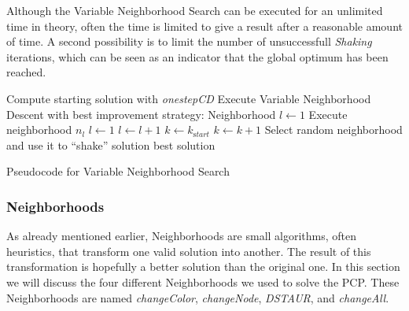 \documentclass[paper=a4,fontsize=12pt]{scrartcl}
\begin{document}
{Although the Variable Neighborhood Search can be executed for an unlimited time in theory, often the time is limited to give a result after a reasonable amount of time. A second possibility is to limit the number of unsuccessfull \emph{Shaking} iterations, which can be seen as an indicator that the global optimum has been reached.


\begin{algorithm}
\begin{algorithmic}[1]
\State Compute starting solution with \emph{onestepCD}
\State Execute Variable Neighborhood Descent with best improvement strategy:
\State Neighborhood $l \leftarrow 1$
\State Execute neighborhood $n_l$
\State  $l\leftarrow 1$  
\Else
\State  $l\leftarrow l + 1$
\EndIf
\EndWhile
{}
\State $k \leftarrow k_{\mathrm start}$ 
\Else
\State $k \leftarrow k + 1$
\EndIf
\State Select random neighborhood and use it to ``shake'' solution
\EndWhile
\State\Return best solution
\end{algorithmic}
\caption{Pseudocode for Variable Neighborhood Search}
\end{algorithm}
}

\subsubsection{Neighborhoods}
\label{sec:neigh}
As already mentioned earlier, Neighborhoods are small algorithms, often heuristics, that transform one valid solution into another. The result of this transformation is hopefully a better solution than the original one. In this section we will discuss the four different Neighborhoods we used to solve the PCP. These Neighborhoods are named \emph{changeColor}, \emph{changeNode}, \emph{DSTAUR}, and \emph{changeAll}.

\end{document}
